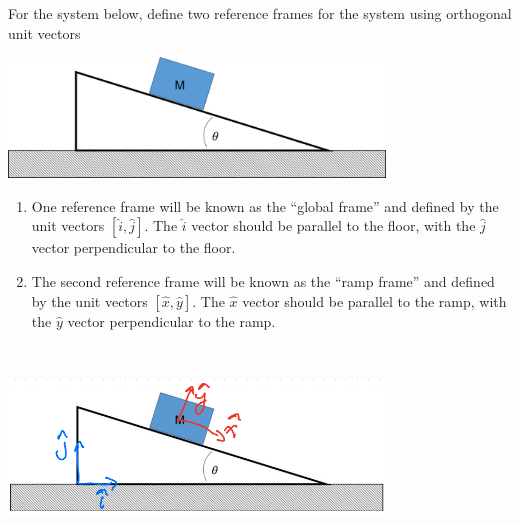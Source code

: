 For the system below, define two reference frames for the system using orthogonal unit vectors

\begin{center}
    \includegraphics[width=0.75\textwidth]{img/fig24_7.png}
\end{center}

\begin{enumerate}
    \item One reference frame will be known as the “global frame” and defined by the unit vectors $\left[\hat{i}, \hat{j}\right]$. The $\hat{i}$ vector should be parallel to the floor, with the $\hat{j}$ vector perpendicular to the floor.
    \item The second reference frame will be known as the “ramp frame” and defined by the unit vectors $\left[\hat{x}, \hat{y}\right]$. The $\hat{x}$ vector should be parallel to the ramp, with the $\hat{y}$ vector perpendicular to the ramp.
\end{enumerate}

\begin{solution}\
\begin{center}
    \includegraphics[width=0.75\textwidth]{img/e9p1.png}
\end{center}
\end{solution}
